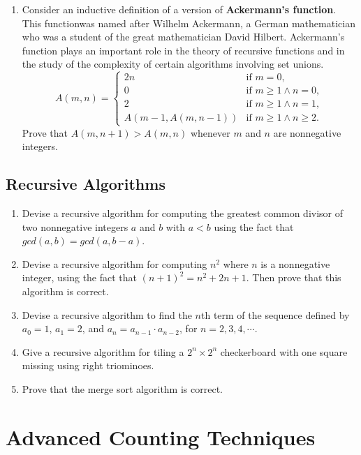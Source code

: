 \documentclass{../../cls/sig-alternate-05-2015}
\begin{document}
\begin{enumerate}
\item Consider an inductive definition of a version of \textbf{Ackermann's function}.
This functionwas named after Wilhelm Ackermann,
a German mathematician who was a student of the great mathematician David Hilbert.
Ackermann's function plays an important role in the theory of recursive functions and in the study of the complexity of certain algorithms involving set unions.
\begin{equation}
    A(m, n) = \begin{cases}
    2n & \text{if } m = 0,\\
    0 & \text{if } m \ge 1 \land n = 0,\\
    2 & \text{if } m \ge 1 \land n = 1,\\
    A(m - 1, A(m, n - 1)) & \text{if } m \ge 1 \land n \ge 2.
    \end{cases}
\end{equation}
Prove that $A(m, n + 1) > A(m, n)$ whenever $m$ and $n$ are
nonnegative integers.

\end{enumerate}

\subsection{Recursive Algorithms}
\begin{enumerate}
\item Devise a recursive algorithm for computing the greatest
common divisor of two nonnegative integers $a$ and $b$ with
$a < b$ using the fact that $gcd(a, b) = gcd(a, b - a)$.

\item Devise a recursive algorithm for computing $n^2$ where $n$
is a nonnegative integer, using the fact that $(n + 1)^2 = n^2 + 2n + 1$. 
Then prove that this algorithm is correct.

\item Devise a recursive algorithm to find the $n$th term of the sequence defined by $a_0 = 1$, $a_1 = 2$, and $a_n = a_{n-1} \cdot a_{n-2}$,
for $n = 2, 3, 4, \cdots$.

\item Give a recursive algorithm for tiling a $2^n \times 2^n$ checkerboard with one square missing using right triominoes.

\item Prove that the merge sort algorithm is correct.
\end{enumerate}

\section{Advanced Counting Techniques}
\end{document}
